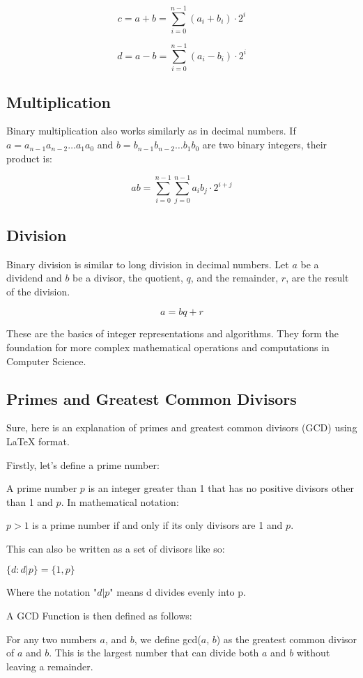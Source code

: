 \[
c = a + b = \sum_{i=0}^{n-1} (a_i + b_i) \cdot 2^i
\]

\[
d = a - b = \sum_{i=0}^{n-1} (a_i - b_i) \cdot 2^i
\]

\subsection{Multiplication}

Binary multiplication also works similarly as in decimal numbers. If $a = a_{n-1}a_{n-2}\ldots a_{1}a_{0}$ and $b = b_{n-1}b_{n-2}\ldots b_{1}b_{0}$ are two binary integers, their product is:

\[
ab = \sum_{i=0}^{n-1} \sum_{j=0}^{n-1} a_i b_j \cdot 2^{i+j}
\]

\subsection{Division}
Binary division is similar to long division in decimal numbers. Let $a$ be a dividend and $b$ be a divisor, the quotient, $q$, and the remainder, $r$, are the result of the division.

\[
a = bq + r
\]



These are the basics of integer representations and algorithms. They form the foundation for more complex mathematical operations and computations in Computer Science.

\subsection{Primes and Greatest Common Divisors}
Sure, here is an explanation of primes and greatest common divisors (GCD) using LaTeX format.

Firstly, let's define a prime number:

A prime number $p$ is an integer greater than 1 that has no positive divisors other than 1 and $p$. In mathematical notation:

$p > 1$ is a prime number if and only if its only divisors are 1 and $p$.

This can also be written as a set of divisors like so:

$\{d : d | p\} = \{1, p\}$

Where the notation "$d | p$" means d divides evenly into p.

A GCD Function is then defined as follows:

For any two numbers $a$, and $b$, we define gcd($a$, $b$) as the greatest common divisor of $a$ and $b$. This is the largest number that can divide both $a$ and $b$ without leaving a remainder.

